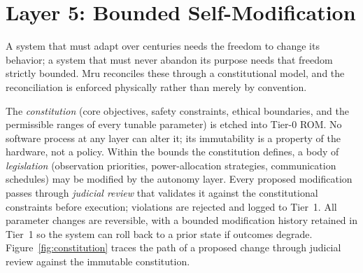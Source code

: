 \documentclass[10pt, a4paper]{article}
\begin{document}
\section{Layer 5: Bounded Self-Modification}

A system that must adapt over centuries needs the freedom to change its behavior; a system that must never abandon its purpose needs that freedom strictly bounded. Mru reconciles these through a constitutional model, and the reconciliation is enforced physically rather than merely by convention.

The \textit{constitution} (core objectives, safety constraints, ethical boundaries, and the permissible ranges of every tunable parameter) is etched into Tier-0 ROM. No software process at any layer can alter it; its immutability is a property of the hardware, not a policy. Within the bounds the constitution defines, a body of \textit{legislation} (observation priorities, power-allocation strategies, communication schedules) may be modified by the autonomy layer. Every proposed modification passes through \textit{judicial review} that validates it against the constitutional constraints before execution; violations are rejected and logged to Tier~1. All parameter changes are reversible, with a bounded modification history retained in Tier~1 so the system can roll back to a prior state if outcomes degrade. Figure~\ref{fig:constitution} traces the path of a proposed change through judicial review against the immutable constitution.
\end{document}
